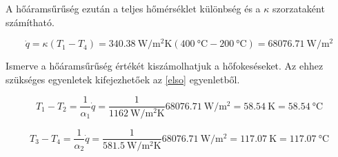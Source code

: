 \noindent A hőáramsűrűség ezután a teljes hőmérséklet különbség és a $\kappa$ szorzataként számítható.

\begin{equation}
\dot{q}=\kappa(T_1-T_4)=\SI{340,38}{\watt\per\meter\squared\kelvin}(\SI{400}{\degreeCelsius}-\SI{200}{\degreeCelsius})=\SI{68076,71}{\watt\per\meter\squared}
\end{equation}

\noindent Ismerve a hőáramsűrűség értékét kiszámolhatjuk a hőfokeséseket. Az ehhez szükséges egyenletek kifejezhetőek az \ref{elso} egyenletből.

\begin{equation}
T_1-T_2=\dfrac{1}{\alpha_1}\dot{q}=\dfrac{1}{\SI{1162}{\watt\per\meter\squared\kelvin}}\SI{68076,71}{\watt\per\meter\squared}=\SI{58,54}{\kelvin}=\SI{58,54}{\degreeCelsius}
\end{equation}

\begin{equation}
T_3-T_4=\dfrac{1}{\alpha_2}\dot{q}=\dfrac{1}{\SI{581,5}{\watt\per\meter\squared\kelvin}}\SI{68076,71}{\watt\per\meter\squared}=\SI{117,07}{\kelvin}=\SI{117,07}{\degreeCelsius}
\end{equation}

